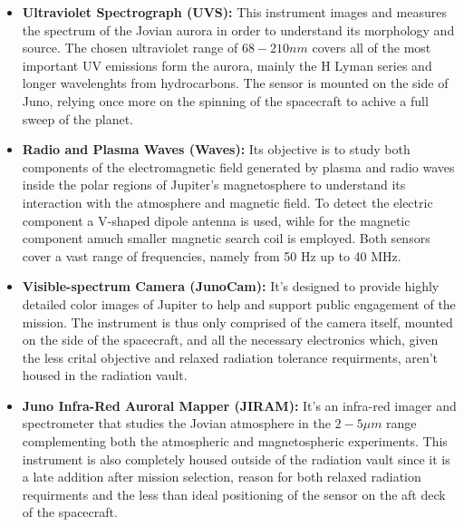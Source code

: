 \begin{itemize}
    \item \textbf{Ultraviolet Spectrograph (UVS):} This instrument images and measures the spectrum of the Jovian aurora in order to understand its morphology and source. The chosen ultraviolet range of \(68 - 210 nm\) covers all of the most important UV emissions form the aurora, mainly the H Lyman series and longer wavelenghts from hydrocarbons. The sensor is mounted on the side of Juno, relying once more on the spinning of the spacecraft to achive a full sweep of the planet. 
    
    \item \textbf{Radio and Plasma Waves (Waves):} Its objective is to study both components of the electromagnetic field generated by plasma and radio waves inside the polar regions of Jupiter's magnetosphere to understand its interaction with the atmosphere and magnetic field. To detect the electric component a V-shaped dipole antenna is used, wihle for the magnetic component amuch smaller magnetic search coil is employed. Both sensors cover a vast range of frequencies, namely from 50 Hz up to 40 MHz.

    \item \textbf{Visible-spectrum Camera (JunoCam):} It's designed to provide highly detailed color images of Jupiter to help and support public engagement of the mission. The instrument is thus only comprised of the camera itself, mounted on the side of the spacecraft, and all the necessary electronics which, given the less crital objective and relaxed radiation tolerance requirments, aren't housed in the radiation vault.

    \item \textbf{Juno Infra-Red Auroral Mapper (JIRAM):} It's an infra-red imager and spectrometer that studies the Jovian atmosphere in the \(2-5 \mu m\) range complementing both the atmospheric and magnetospheric experiments. This instrument is also completely housed outside of the radiation vault since it is a late addition after mission selection, reason for both relaxed radiation requirments and the less than ideal positioning of the sensor on the aft deck of the spacecraft.
       
\end{itemize}

